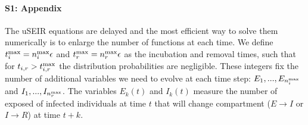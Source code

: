 \documentclass[10pt,letterpaper]{article}
\begin{document}
\paragraph*{S1: Appendix}
\label{appendix}

The uSEIR equations are delayed and the most efficient way to solve them numerically is to enlarge the number of functions at each time. We define $t_i^{\rm max}=n_i^{\rm max} \epsilon$ and $t_r^{\rm max}=n_r^{\rm max} \epsilon$ as the incubation and removal times, such that for $t_{i,r}> t_{i,r}^{\rm max}$ the distribution probabilities are negligible.
These integers fix the number of additional variables we need to evolve at each time step: $E_1,...,E_{n_i^{\rm max}}$ and $I_1,...,I_{n_r^{\rm max}}$. The variables $E_k(t)$ and $I_k(t)$ measure the number of exposed of infected individuals at time $t$ that will change compartment ($E\rightarrow I$ or $I \rightarrow R$) at time $t+k$.

\end{document}
